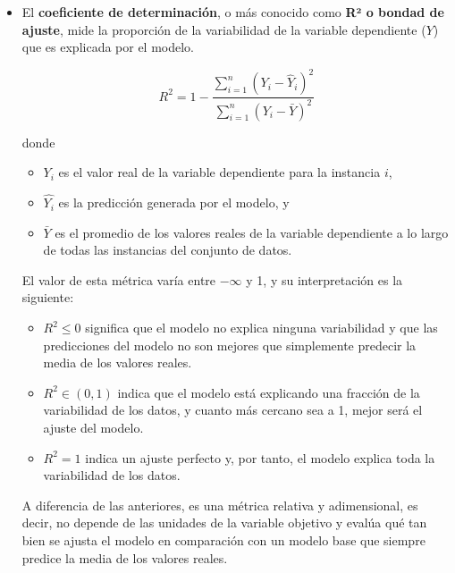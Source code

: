\begin{itemize}
    \item El \textbf{coeficiente de determinación}, o más conocido como \textbf{R² o bondad de ajuste}, mide la 
    proporción de la variabilidad de la variable dependiente ($Y$) que es explicada por el modelo.

    $$
    R^2 = 1 - \frac{\sum_{i=1}^n (Y_i - \hat{Y}_i)^2}{\sum_{i=1}^n (Y_i - \bar{Y})^2}
    $$

    donde 

    \begin{itemize}

        \item $Y_i$ es el valor real de la variable dependiente para la instancia $i$,
        
        \item $\hat{Y_i}$ es la predicción generada por el modelo, y
        
        \item $\bar{Y}$ es el promedio de los valores reales de la variable dependiente a lo largo de todas 
        las instancias del conjunto de datos.
    
    \end{itemize}
    

    El valor de esta métrica varía entre $-\infty$ y 1, y su interpretación es la siguiente:

    \begin{itemize}

        \item $R^2 \le 0$ significa que el modelo no explica ninguna variabilidad y que las predicciones del modelo 
        no son mejores que simplemente predecir la media de los valores reales.
        
        \item $R^2 \in \left(0,1\right)$ indica que el modelo está explicando una fracción de la variabilidad de los 
        datos, y cuanto más cercano sea a 1, mejor será el ajuste del modelo.
        
        \item $R^2 = 1$ indica un ajuste perfecto y, por tanto, el modelo explica toda la variabilidad de los datos. 
    
    \end{itemize}

    A diferencia de las anteriores, es una métrica relativa y adimensional, es decir, no depende de las unidades de 
    la variable objetivo y evalúa qué tan bien se ajusta el modelo en comparación con un modelo base que siempre 
    predice la media de los valores reales.
    
\end{itemize}

